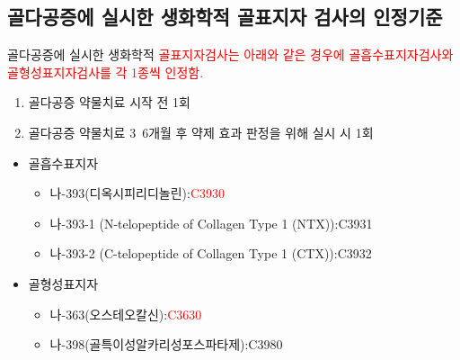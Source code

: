 \subsection{골다공증에 실시한 생화학적 골표지자 검사의 인정기준}
골다공증에 실시한 생화학적 \textcolor{red}{골표지자검사는 아래와 같은 경우에 골흡수표지자검사와 골형성표지자검사를 각 1종씩 인정함.}
\begin{enumerate}[가.]\tightlist
\item 골다공증 약물치료 시작 전 1회
\item 골다공증 약물치료 3~6개월 후 약제 효과 판정을 위해 실시 시 1회
\end{enumerate}
\begin{itemize}[*]\tightlist
\item 골흡수표지자
	\begin{itemize}[-]\tightlist
	\item 나-393(디옥시피리디놀린):\textcolor{red}{C3930}
	\item 나-393-1 (N-telopeptide of Collagen Type 1 (NTX)):C3931
	\item 나-393-2 (C-telopeptide of Collagen Type 1 (CTX)):C3932
	\end{itemize}
\item 골형성표지자
	\begin{itemize}[-]\tightlist
	\item 나-363(오스테오칼신):\textcolor{red}{C3630}
	\item 나-398(골특이성알카리성포스파타제):C3980
	\end{itemize}
\end{itemize} 

